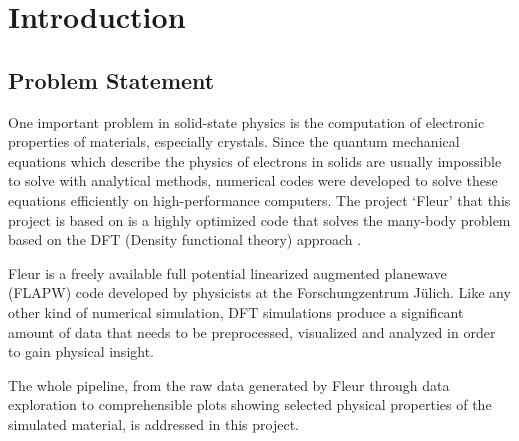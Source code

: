 
\chapter{Introduction}
\label{chap:intro}

\section{Problem Statement}
\label{sec:problem-statement}

One important problem in solid-state physics is the computation of electronic properties of materials, especially crystals. Since the quantum mechanical equations which describe the physics of electrons in solids are usually impossible to solve with analytical methods, numerical codes were developed to solve these equations efficiently on high-performance computers. The project `Fleur' that this project is based on is a highly optimized code that solves the many-body problem based on the DFT (Density functional theory) approach \cite{fleur}.

Fleur is a freely available full potential linearized augmented planewave (FLAPW) code developed by physicists at the Forschungzentrum Jülich. Like any other kind of numerical simulation, DFT simulations produce a significant amount of data that needs to be preprocessed, visualized and analyzed in order to gain physical insight. 

The whole pipeline, from the raw data generated by Fleur through data exploration to comprehensible plots showing selected physical properties of the simulated material, is addressed in this project. 




